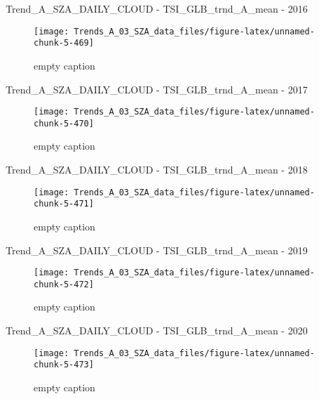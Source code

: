 \documentclass[
  10pt,
  a4paper,oneside]{article}
\begin{document}
Trend\_A\_SZA\_DAILY\_CLOUD - TSI\_GLB\_trnd\_A\_mean - 2016

\begin{figure}[!ht]

{\centering \texttt{[image: Trends\_A\_03\_SZA\_data\_files/figure-latex/unnamed-chunk-5-469]} 

}

\caption{ empty caption }\label{fig:unnamed-chunk-5-469}
\end{figure}

Trend\_A\_SZA\_DAILY\_CLOUD - TSI\_GLB\_trnd\_A\_mean - 2017

\begin{figure}[!ht]

{\centering \texttt{[image: Trends\_A\_03\_SZA\_data\_files/figure-latex/unnamed-chunk-5-470]} 

}

\caption{ empty caption }\label{fig:unnamed-chunk-5-470}
\end{figure}

Trend\_A\_SZA\_DAILY\_CLOUD - TSI\_GLB\_trnd\_A\_mean - 2018

\begin{figure}[!ht]

{\centering \texttt{[image: Trends\_A\_03\_SZA\_data\_files/figure-latex/unnamed-chunk-5-471]} 

}

\caption{ empty caption }\label{fig:unnamed-chunk-5-471}
\end{figure}

Trend\_A\_SZA\_DAILY\_CLOUD - TSI\_GLB\_trnd\_A\_mean - 2019

\begin{figure}[!ht]

{\centering \texttt{[image: Trends\_A\_03\_SZA\_data\_files/figure-latex/unnamed-chunk-5-472]} 

}

\caption{ empty caption }\label{fig:unnamed-chunk-5-472}
\end{figure}

Trend\_A\_SZA\_DAILY\_CLOUD - TSI\_GLB\_trnd\_A\_mean - 2020

\begin{figure}[!ht]

{\centering \texttt{[image: Trends\_A\_03\_SZA\_data\_files/figure-latex/unnamed-chunk-5-473]} 

}

\caption{ empty caption }\label{fig:unnamed-chunk-5-473}
\end{figure}
\end{document}
